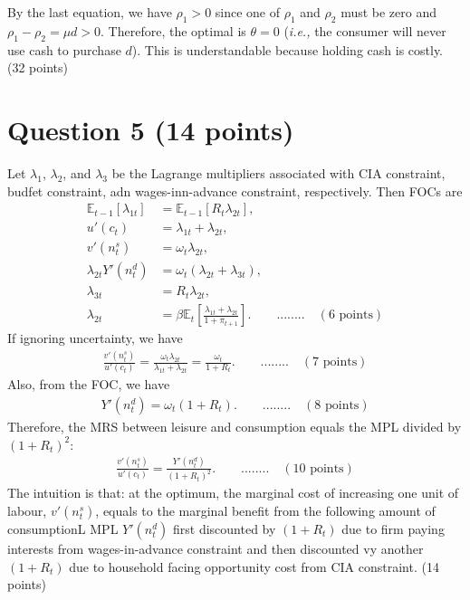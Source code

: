 \documentclass[12pt]{article}
\begin{document}
By the last equation, we have $\rho_1 > 0$ since one of $\rho_1$ and $\rho_2$ must be zero and $\rho_1 - \rho_2 = \mu d >0$. Therefore, the optimal is $\theta = 0$ (\textit{i.e.,} the consumer will never use cash to purchase $d$). This is understandable because holding cash is costly. (32 points)

\newpage
\section*{Question 5 (14 points)}
Let $\lambda_1$, $\lambda_2$, and $\lambda_3$ be the Lagrange multipliers associated with CIA constraint, budfet constraint, adn wages-inn-advance constraint, respectively. Then FOCs are
\begin{align*}
    \mathbb{E}_{t-1}[\lambda_{1 t}] &= \mathbb{E}_{t-1} [ R_t \lambda_{2 t}],\\
    u'(c_t) &= \lambda_{1 t} + \lambda_{2 t},\\
    v'(n^s_t) &= \omega_t \lambda_{2 t},\\
    \lambda_{2 t} Y'(n_t^d) &= \omega_t (\lambda_{2 t} + \lambda_{3 t}),\\
    \lambda_{3 t} &= R_t \lambda_{2 t},\\
    \lambda_{2 t} &= \beta \mathbb{E}_t \left[\frac{\lambda_{1 t} + \lambda_{2 t}}{1+\pi_{t+1}}\right]. \qquad ........ \quad(6 \text{ points})
\end{align*}
If ignoring uncertainty, we have
\begin{align*}
    \frac{v'(n_t^s)}{u'(c_t)} = \frac{\omega_t \lambda_{2 t}}{\lambda_{1 t} + \lambda_{2 t}} = \frac{\omega_t}{1+R_t}. \qquad ........ \quad(7 \text{ points})
\end{align*}
Also, from the FOC, we have
\begin{align*}
    Y'(n_t^d) = \omega_t(1+R_t). \qquad ........ \quad(8 \text{ points})
\end{align*}
Therefore, the MRS between leisure and consumption equals the MPL divided by $(1+R_t)^2$:
\begin{align*}
    \frac{v'(n_t^s)}{u'(c_t)} = \frac{Y'(n_t^d)}{(1+R_t)^2}. \qquad ........ \quad(10 \text{ points})
\end{align*}
The intuition is that: at the optimum, the marginal cost of increasing one unit of labour, $v'(n_t^s)$, equals to the marginal benefit from the following amount of consumptionL MPL $Y'(n_t^d)$ first discounted by $(1+R_t)$ due to firm paying interests from wages-in-advance constraint and then discounted vy another $(1+R_t)$ due to household facing opportunity cost from CIA constraint. (14 points)
\end{document}
